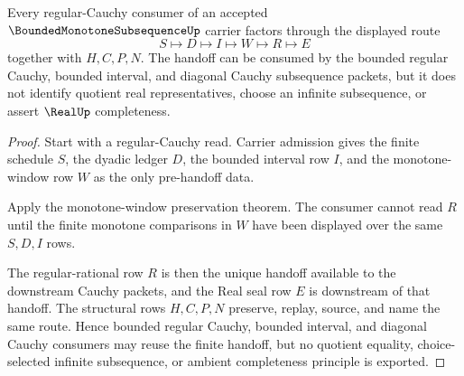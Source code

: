 \begin{theorem}
\label{thm:bounded-monotone-subsequence-regular-cauchy-handoff}
Every regular-Cauchy consumer of an accepted $\BoundedMonotoneSubsequenceUp$ carrier factors through the displayed route
$$
S\longmapsto D\longmapsto I\longmapsto W\longmapsto R\longmapsto E
$$
together with $H,C,P,N$. The handoff can be consumed by the bounded regular Cauchy, bounded interval, and diagonal Cauchy subsequence packets, but it does not identify quotient real representatives, choose an infinite subsequence, or assert $\RealUp$ completeness.
\end{theorem}
\begin{proof}
Start with a regular-Cauchy read. Carrier admission gives the finite schedule $S$, the dyadic ledger $D$, the bounded interval row $I$, and the monotone-window row $W$ as the only pre-handoff data.

Apply the monotone-window preservation theorem. The consumer cannot read $R$ until the finite monotone comparisons in $W$ have been displayed over the same $S,D,I$ rows.

The regular-rational row $R$ is then the unique handoff available to the downstream Cauchy packets, and the Real seal row $E$ is downstream of that handoff. The structural rows $H,C,P,N$ preserve, replay, source, and name the same route. Hence bounded regular Cauchy, bounded interval, and diagonal Cauchy consumers may reuse the finite handoff, but no quotient equality, choice-selected infinite subsequence, or ambient completeness principle is exported.
\end{proof}


